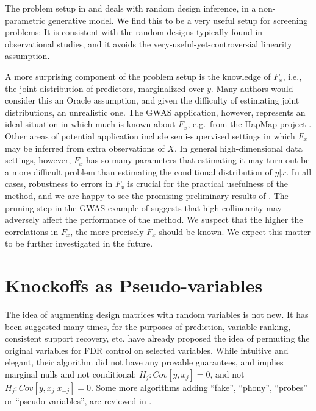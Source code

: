 \documentclass[article,lineno]{biometrika}
\begin{document}
The problem setup in \cite{CandesPanninggoldmodelX2018} and \cite{SesiaGenehuntinghidden} deals with random design inference, in a non-parametric generative model.
We find this to be a very useful setup for screening problems:
It is consistent with the random designs typically found in observational studies, and it avoids the very-useful-yet-controversial linearity assumption.

A more surprising component of the problem setup is the knowledge of $F_x$, i.e., the joint distribution of predictors, marginalized over $y$.
Many authors would consider this an Oracle assumption, and given the difficulty of estimating joint distributions, an unrealistic one.
The GWAS application, however, represents an ideal situation in which much is known about $F_x$, e.g.\ from the HapMap project \citep{Hapmap2003}.
Other areas of potential application include semi-supervised settings in which $F_x$ may be inferred from extra observations of $X$. 
In general high-dimensional data settings, however, $F_x$ has so many parameters that estimating it may turn out be a more difficult problem than estimating the conditional distribution of $y|x$.
In all cases, robustness to errors in $F_x$ is crucial for the practical usefulness of the method, and we are happy to see the promising preliminary results of \cite{CandesPanninggoldmodelX2018}.
The pruning step in the GWAS example of \cite{SesiaGenehuntinghidden} suggests that high collinearity may adversely affect the performance of the method. We suspect that the higher the correlations in $F_x$, the more precisely $F_x$ should be known.
We expect this matter to be further investigated in the future.


\section{Knockoffs as Pseudo-variables}
The idea of augmenting design matrices with random variables is not new.
It has been suggested many times, for the purposes of prediction, variable ranking, consistent support recovery, etc.
\cite{TusherSignificanceanalysismicroarrays2001} have already proposed the idea of permuting the original variables for FDR control on selected variables.
While intuitive and elegant, their algorithm did not have any provable guarantees, and implies marginal nulls and not conditional: $H_j:Cov[y,x_j]=0$, and not $H_j:Cov[y,x_j|x_{-j}]=0$.
Some more algorithms adding ``fake'', ``phony'', ``probes'' or ``pseudo variables'', are reviewed in \cite{GuyonIntroductionVariableFeature2003}.
\end{document}
